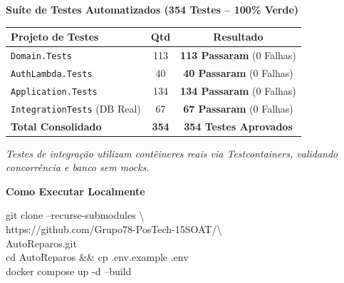 \documentclass[9pt,a4paper]{article}
\begin{document}
\begin{tcolorbox}[cardbox]
    \begin{minipage}[t]{0.54\textwidth}
        \textbf{\color{accentblue} Suíte de Testes Automatizados (354 Testes -- 100\% Verde)}\par\vspace{0.08cm}
        \begin{tabularx}{\textwidth}{X|c|c}
            \textbf{Projeto de Testes} & \textbf{Qtd} & \textbf{Resultado} \\
            \hline
            \texttt{Domain.Tests} & 113 & \textbf{\color{taggreen}113 Passaram} (0 Falhas) \\
            \texttt{AuthLambda.Tests} & 40 & \textbf{\color{taggreen}40 Passaram} (0 Falhas) \\
            \texttt{Application.Tests} & 134 & \textbf{\color{taggreen}134 Passaram} (0 Falhas) \\
            \texttt{IntegrationTests} (DB Real) & 67 & \textbf{\color{taggreen}67 Passaram} (0 Falhas) \\
            \hline
            \textbf{Total Consolidado} & \textbf{354} & \textbf{\color{taggreen}354 Testes Aprovados} \\
        \end{tabularx}
        \vspace{0.05cm}
        \textit{\scriptsize Testes de integração utilizam contêineres reais via Testcontainers, validando concorrência e banco sem mocks.}
    \end{minipage}
    \hfill
    \begin{minipage}[t]{0.43\textwidth}
        \textbf{\color{accentblue} Como Executar Localmente}\par\vspace{0.08cm}
        \begin{tcolorbox}[colback=white, colframe=borderlight, boxrule=0.4pt, arc=2pt, left=3pt, right=3pt, top=2pt, bottom=2pt]
            \ttfamily\tiny
            git clone --recurse-submodules \textbackslash\\
            \phantom{xx}https://github.com/Grupo78-PosTech-15SOAT/\textbackslash\\
            \phantom{xx}AutoReparos.git\\
            cd AutoReparos \&\& cp .env.example .env\\
            docker compose up -d --build
        \end{tcolorbox}

\end{minipage}
\end{tcolorbox}
\end{document}
